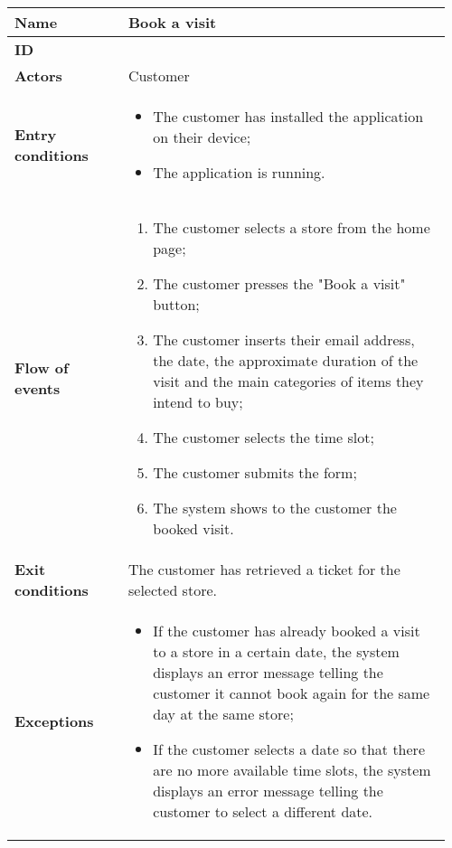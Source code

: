 	\begin{table}[H]
    	\centering
    	\begin{tabular}{@{}p{0.25\linewidth}p{0.71\linewidth}@{}}
    		\toprule
    		\textbf{Name} & Book a visit \\

    		\midrule
    		\textbf{ID} & \usecaseindex ~\\
    		\midrule
    		\textbf{Actors} & Customer \\
    		\midrule
    		\textbf{Entry conditions} &
    		\begin{itemize}[leftmargin=.4cm,noitemsep,topsep=0pt,before=\vspace{-3mm},after=\vspace{-4mm}]
    			\item The customer has installed the application on their device;
    			\item The application is running.
    		\end{itemize} \\
    		\midrule
    		\textbf{Flow of events} &
    		\begin{enumerate}[label=\roman*.,leftmargin=.5cm,noitemsep,topsep=0pt,before=\vspace{-3mm},after=\vspace{-4mm}]
    			\item The customer selects a store from the home page;
    			\item The customer presses the "Book a visit" button;
    			\item The customer inserts their email address, the date, the approximate duration of the visit and the main categories of items they intend to buy;
    			\item The customer selects the time slot;
                \item The customer submits the form;
                \item The system shows to the customer the booked visit.
    		\end{enumerate} \\
    		\midrule
    		\textbf{Exit conditions} & The customer has retrieved a ticket for the selected store. \\
    		\midrule
    		\textbf{Exceptions} &
            \begin{itemize}[leftmargin=.4cm,noitemsep,topsep=0pt,before=\vspace{-3mm},after=\vspace{-4mm}]
                \item If the customer has already booked a visit to a store in a certain date, the system displays an error message telling the customer it cannot book again for the same day at the same store;
                \item If the customer selects a date so that there are no more available time slots, the system displays an error message telling the customer to select a different date.
            \end{itemize} \\


\end{tabular}
\end{table}
